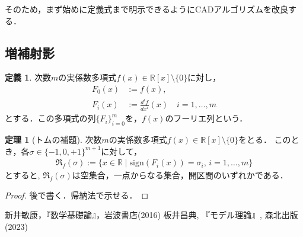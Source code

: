 \documentclass[uplatex, dvipdfmx]{jsarticle}
\newcommand{\R}{\mathbb{R}}
\newcommand{\sign}{\mathrm{sign}}
\theoremstyle{definition}
\newtheorem{definition}{定義}[section]
\newtheorem{theorem}{定理}[section]
\begin{document}
そのため，まず始めに定義式まで明示できるようにCADアルゴリズムを改良する．

\subsection{増補射影}

\begin{definition}
     次数$m$の実係数多項式$f(x) \in \R[x] \setminus \{0\}$に対し，
     \begin{align*}
          F_0(x) &:= f(x),\\
          F_i(x) &:= \frac{d^i f}{dx^i}(x) \quad i = 1, \dots, m
     \end{align*}
     とする．この多項式の列$\{F_i\}_{i=0}^m$を，$f(x)$のフーリエ列という．
\end{definition}

\begin{theorem}[トムの補題]
     次数$m$の実係数多項式$f(x) \in \R[x] \setminus \{0\}$をとる．
     このとき，各$\sigma \in \{-1, 0, +1\}^{m+1}$に対して，
     \begin{align*}
          \mathfrak{R}_f(\sigma) := \{x \in \R \mid \sign(F_i(x)) = \sigma_i, \, i = 1, \dots, m \}
     \end{align*}
     とすると, $\mathfrak{R}_f(\sigma)$は空集合，一点からなる集合，開区間のいずれかである．
\end{theorem}

\begin{proof}
     後で書く．帰納法で示せる．
\end{proof}


\begin{thebibliography}{9}
      新井敏康，『数学基礎論』，岩波書店(2016)
      板井昌典, 『モデル理論』, 森北出版(2023)
\end{thebibliography}
\end{document}
